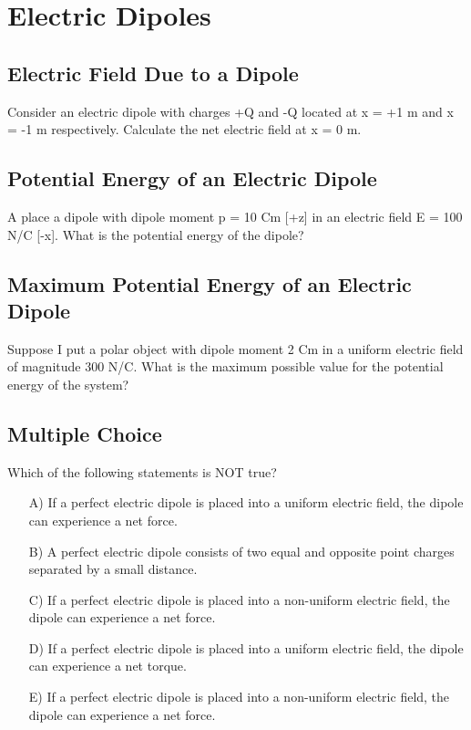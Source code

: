 \documentclass[11pt]{article}
\begin{document}

\pagebreak
\section{Electric Dipoles}

\subsection{Electric Field Due to a Dipole}
Consider an electric dipole with charges +Q and -Q located at x = +1 m and x = -1 m respectively.  Calculate the net electric field at x = 0 m.

\subsection{Potential Energy of an Electric Dipole}
A place a dipole with dipole moment p = 10 Cm [+z] in an electric field E = 100 N/C [-x].  What is the potential energy of the dipole?

\subsection{Maximum Potential Energy of an Electric Dipole}
Suppose I put a polar object with dipole moment 2 Cm in a uniform electric field of magnitude 300 N/C.  What is the maximum possible value for the potential energy of the system?

\subsection{Multiple Choice}
Which of the following statements is NOT true?

\begin{itemize}
	\item[A)] If a perfect electric dipole is placed into a uniform electric field, the dipole can experience a net force.
	\item[B)] A perfect electric dipole consists of two equal and opposite point charges separated by a small distance.
	\item[C)] If a perfect electric dipole is placed into a non-uniform electric field, the dipole can experience a net force.
	\item[D)] If a perfect electric dipole is placed into a uniform electric field, the dipole can experience a net torque.
	\item[E)] If a perfect electric dipole is placed into a non-uniform electric field, the dipole can experience a net force.
\end{itemize}
\end{document}
